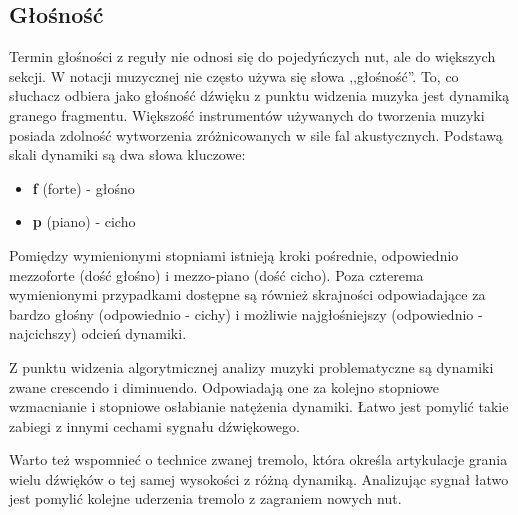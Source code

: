 \documentclass[12pt,a4paper,twoside]{mwart}
\begin{document}
\subsection{Głośność} \label{sec:loudness}
Termin głośności z reguły nie odnosi się do pojedyńczych nut, ale do większych sekcji. W notacji muzycznej nie często używa się słowa ,,głośność''. To, co słuchacz odbiera jako głośność dźwięku z punktu widzenia muzyka jest dynamiką granego fragmentu. Większość instrumentów używanych do tworzenia muzyki posiada zdolność wytworzenia zróżnicowanych w sile fal akustycznych. Podstawą skali dynamiki są dwa słowa kluczowe:

\begin{itemize}
  \item \textbf{f} (forte) - głośno
  \item \textbf{p} (piano) - cicho
\end{itemize}

Pomiędzy wymienionymi stopniami istnieją kroki pośrednie, odpowiednio mezzo\-forte (dość głośno) i mezzo-piano (dość cicho). Poza czterema wymienionymi przypadkami dostępne są również skrajności odpowiadające za bardzo głośny (odpowiednio - cichy) i możliwie najgłośniejszy (odpowiednio - najcichszy) odcień dynamiki.

Z punktu widzenia algorytmicznej analizy muzyki problematyczne są dynamiki zwane crescendo i diminuendo. Odpowiadają one za kolejno stopniowe wzmacnianie i stopniowe osłabianie natężenia dynamiki. Łatwo jest pomylić takie zabiegi z innymi cechami sygnału dźwiękowego.

Warto też wspomnieć o technice zwanej tremolo, która określa artykulacje grania wielu dźwięków o tej samej wysokości z różną dynamiką. Analizując sygnał łatwo jest pomylić kolejne uderzenia tremolo z zagraniem nowych nut.
\end{document}
